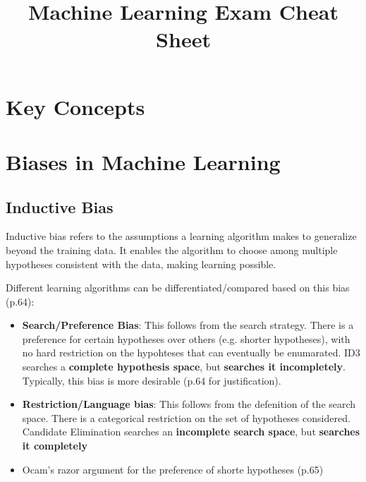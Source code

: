 \documentclass[10pt,a4paper]{article}
\title{Machine Learning Exam Cheat Sheet}
\author{}
\date{}
\begin{document}
\maketitle

\section*{Key Concepts}
\section*{Biases in Machine Learning}

\subsection*{Inductive Bias}
Inductive bias refers to the assumptions a learning algorithm makes to generalize beyond the training data. It enables the algorithm to choose among multiple hypotheses consistent with the data, making learning possible. 

Different learning algorithms can be differentiated/compared based on this bias (p.64):

\begin{itemize}
	\item \textbf{Search/Preference Bias}: This follows from the search strategy. There is a preference for certain hypotheses over others (e.g. shorter hypotheses), with no hard restriction on the hypohteses that can eventually be enumarated. ID3 searches a \textbf{complete hypothesis space}, but  \textbf{searches it incompletely}. Typically, this bias is more desirable (p.64 for justification). 
	
	\item \textbf{Restriction/Language bias}: This follows from the defenition of the search space. There is a categorical restriction on the set of hypotheses considered. Candidate Elimination searches an \textbf{incomplete search space}, but \textbf{searches it completely} 
\end{itemize}

\begin{itemize}
	\item Ocam's razor argument for the preference of shorte hypotheses (p.65)
\end{itemize}


\end{document}
